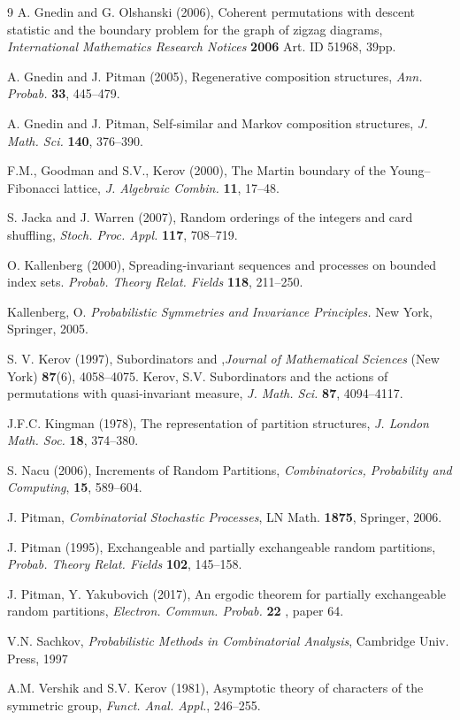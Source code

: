 \documentclass{article}
\begin{document}
\begin{thebibliography}{9}
 A. Gnedin and G. Olshanski (2006), {Coherent permutations with descent statistic and the boundary problem for the graph of zigzag diagrams}, {\it  International Mathematics Research Notices} {\bf 2006} Art. ID 51968, 39pp. 



A. Gnedin and J. Pitman (2005), Regenerative composition structures,  {\it Ann. Probab.} {\bf  33},  445--479.



A. Gnedin and J. Pitman, { Self-similar and Markov composition structures}, {\it J.  Math. Sci.}  {\bf  140}, 376--390.
 

 F.M., Goodman and S.V., Kerov (2000), The Martin boundary of the Young--Fibonacci lattice, {\it J. Algebraic Combin. } {\bf 11}, 17--48.


S. Jacka and J. Warren (2007),
Random orderings of the integers and card shuffling,
{\it Stoch. Proc. Appl.}
{\bf 117}, 708--719.


 O. Kallenberg (2000), Spreading-invariant sequences and processes on bounded index sets. {\it  Probab. Theory Relat. Fields} {\bf 118}, 211--250. 

  Kallenberg, O. {\it Probabilistic Symmetries and Invariance Principles.} New York, Springer, 2005.

S. V. Kerov (1997), {Subordinators and },{\it  Journal of Mathematical Sciences} (New York) {\bf 87}(6), 4058--4075.
Kerov, S.V. Subordinators and the actions of permutations with quasi-invariant measure, {\it J. Math. Sci.}  {\bf 87}, 4094--4117.


 J.F.C. Kingman (1978), The representation of partition structures, {\it J. London Math. Soc.} {\bf 18}, 374--380.

 S. Nacu (2006), {Increments of Random Partitions}, {\it Combinatorics, Probability and Computing}, {\bf 15}, 589--604.

 J. Pitman, {\it Combinatorial Stochastic Processes}, LN Math. {\bf 1875}, Springer, 2006.

J. Pitman (1995), {Exchangeable and partially exchangeable random partitions}, {\it Probab. Theory Relat. Fields} {\bf 102}, 145--158.

J. Pitman, Y. Yakubovich (2017), {An ergodic theorem for partially exchangeable random partitions}, {\it Electron. Commun. Probab.}  {\bf 22} , paper 64.




V.N. Sachkov, {\it Probabilistic Methods in Combinatorial Analysis}, Cambridge Univ. Press, 1997


 A.M. Vershik and S.V. Kerov (1981), Asymptotic theory of characters of the symmetric group,  {\it Funct. Anal. Appl.},  246--255.  


\end{thebibliography}
\end{document}
